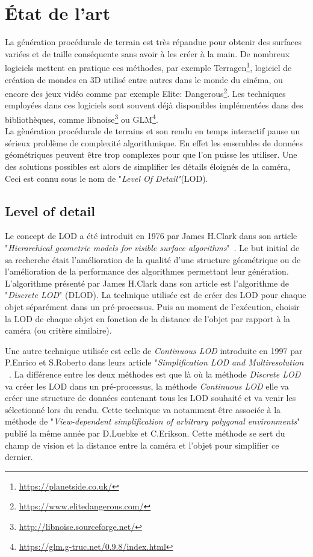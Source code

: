 \chapter*{État de l'art}
\setcounter{chapter}{0}

La génération procédurale de terrain est très répandue pour obtenir des
surfaces variées et de taille conséquente sans avoir à les créer à la
main. De nombreux logiciels mettent en pratique ces méthodes, par
exemple Terragen\footnote{\url{https://planetside.co.uk/}}, logiciel de
création de mondes en 3D utilisé entre autres dans le monde du cinéma,
ou encore des jeux vidéo comme par exemple Elite:
Dangerous\footnote{\url{https://www.elitedangerous.com/}}. Les
techniques employées dans ces logiciels sont souvent déjà disponibles
implémentées dans des bibliothèques, comme
libnoise\footnote{\url{http://libnoise.sourceforge.net/}} ou
GLM\footnote{\url{https://glm.g-truc.net/0.9.8/index.html}}.\\

La gènération procédurale de terrains et son rendu en temps interactif pause un sérieux problème de complexité algorithmique. En effet les ensembles de données géométriques peuvent être trop complexes pour que l'on puisse les utiliser. Une des solutions possibles est alors de simplifier les détails éloignés de la caméra, Ceci est connu sous le nom de "\emph{Level Of Detail"}(LOD).

\section*{Level of detail}

Le concept de LOD a été introduit en 1976 par James H.Clark dans son article "\emph{Hierarchical geometric models for visible surface algorithms}"~\cite{Clark}. Le but initial de sa recherche était l'amélioration de la qualité d'une structure géométrique ou de l'amélioration de la performance des algorithmes permettant leur génération. L'algorithme présenté par James H.Clark dans son article est l'algorithme de "\emph{Discrete LOD}" (DLOD). La technique utilisée est de créer des LOD pour chaque objet séparément dans un pré-processus. Puis au moment de l'exécution, choisir la LOD de chaque objet en fonction de la distance de l'objet par rapport à la caméra (ou critère similaire).

Une autre technique utilisée est celle de \emph{Continuous LOD} introduite en 1997 par P.Enrico et S.Roberto dans leurs article "\emph{Simplification LOD and Multiresolution} ~\cite{Enrico}. La différence entre les deux méthodes est que là où la méthode \emph{Discrete LOD} va créer les LOD dans un pré-processus, la méthode  \emph{Continuous LOD} elle va créer une structure de données contenant tous les LOD souhaité et va venir les sélectionné lors du rendu. Cette technique va notamment être associée à la méthode de "\emph{View-dependent simplification of
arbitrary polygonal environments}"~\cite{view-dependent} publié la même année par D.Luebke et C.Erikson. Cette méthode se sert du champ de vision et la distance entre la caméra et l'objet pour simplifier ce dernier.\\

